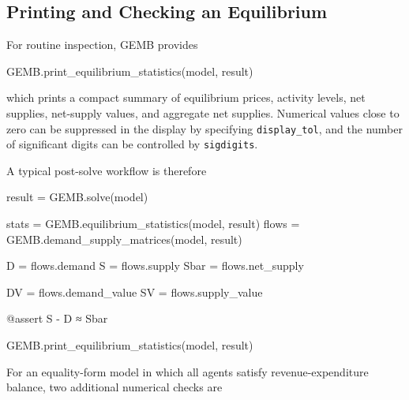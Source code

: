 \documentclass[
  letterpaper,
  DIV=11,
  numbers=noendperiod]{scrreprt}
\newenvironment{Shaded}{\begin{snugshade}}{\end{snugshade}}
\newcommand{\FunctionTok}[1]{\textcolor[rgb]{0.28,0.35,0.67}{#1}}
\newcommand{\NormalTok}[1]{\textcolor[rgb]{0.00,0.23,0.31}{#1}}
\newcommand{\OperatorTok}[1]{\textcolor[rgb]{0.37,0.37,0.37}{#1}}
\newcommand{\PreprocessorTok}[1]{\textcolor[rgb]{0.68,0.00,0.00}{#1}}
\begin{document}
\subsection{Printing and Checking an
Equilibrium}\label{printing-and-checking-an-equilibrium}

For routine inspection, GEMB provides

\begin{Shaded}
\begin{Highlighting}[]
\NormalTok{GEMB.}\FunctionTok{print\_equilibrium\_statistics}\NormalTok{(model, result)}
\end{Highlighting}
\end{Shaded}

which prints a compact summary of equilibrium prices, activity levels,
net supplies, net-supply values, and aggregate net supplies. Numerical
values close to zero can be suppressed in the display by specifying
\texttt{display\_tol}, and the number of significant digits can be
controlled by \texttt{sigdigits}.

A typical post-solve workflow is therefore

\begin{Shaded}
\begin{Highlighting}[]
\NormalTok{result }\OperatorTok{=}\NormalTok{ GEMB.}\FunctionTok{solve}\NormalTok{(model)}

\NormalTok{stats }\OperatorTok{=}\NormalTok{ GEMB.}\FunctionTok{equilibrium\_statistics}\NormalTok{(model, result)}
\NormalTok{flows }\OperatorTok{=}\NormalTok{ GEMB.}\FunctionTok{demand\_supply\_matrices}\NormalTok{(model, result)}

\NormalTok{D }\OperatorTok{=}\NormalTok{ flows.demand}
\NormalTok{S }\OperatorTok{=}\NormalTok{ flows.supply}
\NormalTok{Sbar }\OperatorTok{=}\NormalTok{ flows.net\_supply}

\NormalTok{DV }\OperatorTok{=}\NormalTok{ flows.demand\_value}
\NormalTok{SV }\OperatorTok{=}\NormalTok{ flows.supply\_value}

\PreprocessorTok{@assert}\NormalTok{ S }\OperatorTok{{-}}\NormalTok{ D }\OperatorTok{≈}\NormalTok{ Sbar}

\NormalTok{GEMB.}\FunctionTok{print\_equilibrium\_statistics}\NormalTok{(model, result)}
\end{Highlighting}
\end{Shaded}

For an equality-form model in which all agents satisfy
revenue-expenditure balance, two additional numerical checks are
\end{document}
